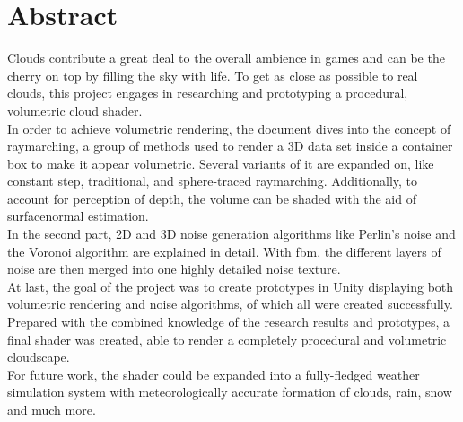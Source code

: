 \section*{Abstract}
\color{orange}
Clouds contribute a great deal to the overall ambience in games and can be the cherry on top by filling the sky with life.
To get as close as possible to real clouds, this project engages in researching and prototyping a \gls{procedural}, volumetric cloud shader.
\\
In order to achieve \gls{volumetric} rendering, the document dives into the concept of \gls{raymarching}, a group of methods used to render a 3D data set inside a container box to make it appear volumetric.
Several variants of it are expanded on, like constant step, traditional, and sphere-traced \gls{raymarching}. Additionally, to account for perception of depth, the volume can be shaded with the aid of \gls{surfacenormal} estimation.
\\
In the second part, 2D and 3D \gls{noise} generation algorithms like Perlin's noise and the Voronoi algorithm are explained in detail. With \gls{fbm}, the different layers of noise are then merged into one highly detailed noise texture.
\\
At last, the goal of the project was to create prototypes in Unity displaying both volumetric rendering and noise algorithms, of which all were created successfully.
Prepared with the combined knowledge of the research results and prototypes, a final shader was created, able to render a completely \gls{procedural} and volumetric cloudscape.
\\
For future work, the shader could be expanded into a fully-fledged weather simulation system with meteorologically accurate formation of clouds, rain, snow and much more.
\color{black}